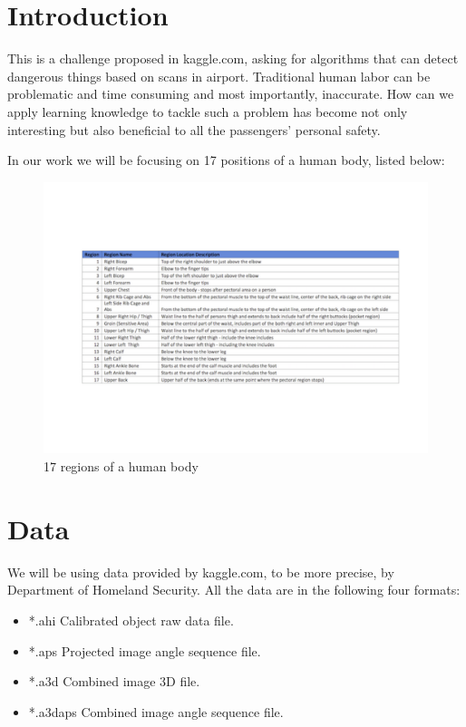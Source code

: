 \documentclass[conference,compsoc]{IEEEtran}
\begin{document}
\section{Introduction}
	\par
	This is a challenge proposed in kaggle.com, asking for algorithms that can detect dangerous things based on scans in airport. Traditional human labor can be problematic and time consuming and most importantly, inaccurate. How can we apply learning knowledge to tackle such a problem has become not only interesting but also beneficial to all the passengers' personal safety.
	\par 
	In our work we will be focusing on 17 positions of a human body, listed below:
	\begin{figure}[h]
		\includegraphics[scale=0.3]{Pic/body_zones.pdf}
		\caption{17 regions of a human body}
	\end{figure}
\section{Data}
	We will be using data provided by kaggle.com, to be more precise, by Department of Homeland Security. All the data are in the following four formats:
	\begin{itemize}
		\item{*.ahi} Calibrated object raw data file.
		\item{*.aps} Projected image angle sequence file.
		\item{*.a3d} Combined image 3D file.
		\item{*.a3daps} Combined image angle sequence file.
	\end{itemize}
\end{document}
